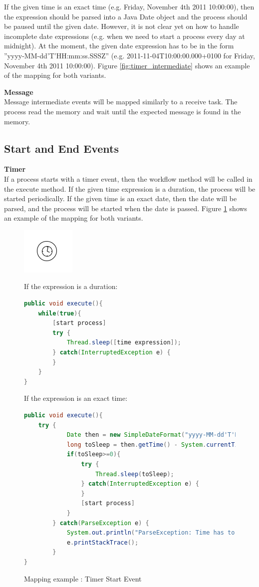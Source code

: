 If the given time is an exact time (e.g. Friday, November 4th 2011 10:00:00), then the expression should be parsed into a Java Date object and the process should be paused until the given date. However, it is not clear yet on how to handle incomplete date expressions (e.g. when we need to start a process every day at midnight). At the moment, the given date expression has to be in the form ''yyyy-MM-dd'T'HH:mm:ss.SSSZ'' (e.g. 2011-11-04T10:00:00.000+0100 for Friday, November 4th 2011 10:00:00). Figure \ref{fig:timer_intermediate}
shows an example of the mapping for both variants.

\textbf{Message}\\
Message intermediate events will be mapped similarly to a receive task. The process read the memory and wait until the expected message is found in the memory. 

\subsection{Start and End Events}

\textbf{Timer}\\
If a process starts with a timer event, then the workflow method will be called in the execute method. If the given time expression is a duration, the process will be started periodically. If the given time is an exact date, then the date will be parsed, and the process will be started when the date is passed. Figure \ref{fig:timer_start} shows an example of the mapping for both variants.

\begin{figure}[h]
\begin{minipage}[c]{0.28\textwidth}
\includegraphics{images/mapping/timer_start.png}
\end{minipage}
\begin{minipage}[c]{0.72\textwidth}
If the expression is a duration:
\begin{lstlisting}[language = Java]
public void execute(){
	while(true){
		[start process]
		try {
			Thread.sleep([time expression]);
		} catch(InterruptedException e) {
		}
	}
}
\end{lstlisting}
If the expression is an exact time:
\begin{lstlisting}[language = Java]
public void execute(){
	try {
			Date then = new SimpleDateFormat("yyyy-MM-dd'T'HH:mm:ss.SSSZ").parse("2011-11-04T10:00:00.000+0100");
			long toSleep = then.getTime() - System.currentTimeMillis();
			if(toSleep>=0){
				try {
					Thread.sleep(toSleep);
				} catch(InterruptedException e) {
				}
				[start process]
			}
		} catch(ParseException e) {
			System.out.println("ParseException: Time has to be in yyyy-MM-dd'T'HH:mm:ss.SSSZ form");
			e.printStackTrace();
		}
}
\end{lstlisting}
\end{minipage}
\caption{Mapping example : Timer Start Event}%
\label{fig:timer_start}%
\end{figure}

